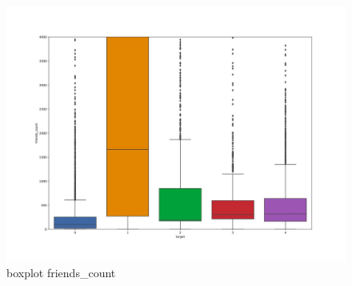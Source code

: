 \begin{figure}
	\centering
	\includegraphics[width=\columnwidth]{chapter3/figure/boxplot_friends.jpg}
	\caption{boxplot friends\_count}
	\label{fig:box_friends}
\end{figure}

